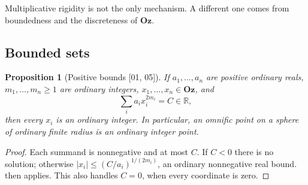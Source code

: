 \documentclass[11pt,oneside]{article}
\numberwithin{equation}{section}
\newtheorem{proposition}[proposition]{Proposition}
\theoremstyle{definition}
\theoremstyle{remark}
\newcommand{\Oz}{\mathbf{Oz}}
\newcommand{\R}{\mathbb R}
\newcommand{\src}[1]{\textup{\textsf{\small[#1]}}}
\begin{document}
Multiplicative rigidity is not the only mechanism. A different one comes
from boundedness and the discreteness of $\Oz$.

\subsection{Bounded sets}

\begin{proposition}[Positive bounds \src{01, 05}]\label{odg:prop:squaresbound}
If $a_1,\ldots,a_n$ are positive ordinary reals, $m_1,\ldots,m_n\ge1$ are
ordinary integers, $x_1,\ldots,x_n\in\Oz$, and
\[
 \sum_i a_i x_i^{2m_i}=C\in\R,
\]
then every $x_i$ is an ordinary integer. In particular, an omnific point on
a sphere of ordinary finite radius is an ordinary integer point.
\end{proposition}
\begin{proof}
Each summand is nonnegative and at most $C$. If $C<0$ there is no solution;
otherwise
$|x_i|\le(C/a_i)^{1/(2m_i)}$, an ordinary nonnegative real bound.
 then applies. This also handles $C=0$, when every
coordinate is zero.
\end{proof}
\end{document}

